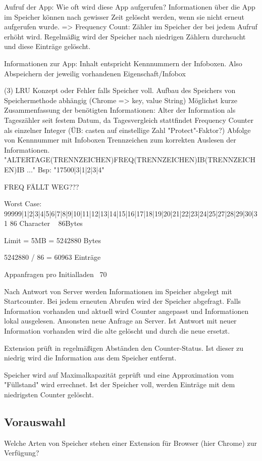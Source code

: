Aufruf der App:
Wie oft wird diese App aufgerufen?
Informationen über die App im Speicher können nach gewisser Zeit gelöscht werden, wenn sie nicht erneut aufgerufen wurde.
=> Frequency Count: Zähler im Speicher der bei jedem Aufruf erhöht wird. Regelmäßig wird der Speicher nach niedrigen Zählern durchsucht und diese Einträge gelöscht.

Informationen zur App:
Inhalt entspricht Kennnummern der Infoboxen. Also Abspeichern der jeweilig vorhandenen Eigenschaft/Infobox

(3)
LRU Konzept oder Fehler falls Speicher voll.
Aufbau des Speichers von Speichermethode abhängig (Chrome => key, value String)
Möglichst kurze Zusammenfassung der benötigten Informationen:
Alter der Information als Tageszähler seit festem Datum, da Tagesvergleich stattfindet
Frequency Counter als einzelner Integer (ÜB: casten auf einstellige Zahl "Protect"-Faktor?)
Abfolge von Kennnummer mit Infoboxen
Trennzeichen zum korrekten Auslesen der Informationen.
"ALTERTAGE(TRENNZEICHEN)FREQ(TRENNZEICHEN)IB(TRENNZEICHEN)IB ..."
Bsp: "17500|3|1|2|3|4"

FREQ FÄLLT WEG???

Worst Case:
99999|1|2|3|4|5|6|7|8|9|10|11|12|13|14|15|16|17|18|19|20|21|22|23|24|25|27|28|29|30|31
86 Character ~ 86Bytes

Limit = 5MB = 5242880 Bytes

5242880 / 86 = 60963 Einträge

Appanfragen pro Initialladen ~70


Nach Antwort von Server werden Informationen im Speicher abgelegt mit Startcounter.
Bei jedem erneuten Abrufen wird der Speicher abgefragt. Falls Information vorhanden und aktuell wird Counter angepasst und Informationen lokal ausgelesen. Ansonsten neue Anfrage an Server. Ist Antwort mit neuer Information vorhanden wird die alte gelöscht und durch die neue ersetzt.

Extension prüft in regelmäßigen Abständen den Counter-Status. Ist dieser zu niedrig wird die Information aus dem Speicher entfernt.

Speicher wird auf Maximalkapazität geprüft und eine Approximation vom "Füllstand" wird errechnet. Ist der Speicher voll, werden Einträge mit dem niedrigsten Counter gelöscht.



\subsection{Vorauswahl}
\label{vorauswahl}
Welche Arten von Speicher stehen einer Extension für Browser (hier Chrome) zur Verfügung?

